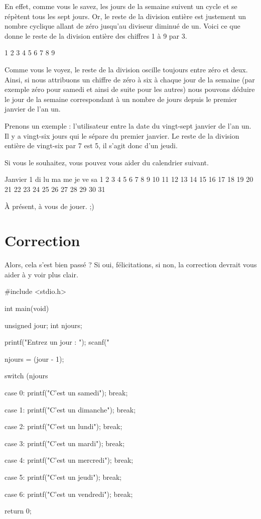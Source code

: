 En effet, comme vous le savez, les jours de la semaine suivent un cycle
et se répètent tous les sept jours. Or, le reste de la division entière
est justement un nombre cyclique allant de zéro jusqu'au diviseur
diminué de un. Voici ce que donne le reste de la division entière des
chiffres 1 à 9 par 3.

\begin{C}
1 %
2 %
3 %
4 %
5 %
6 %
7 %
8 %
9 %
\end{C}

Comme vous le voyez, le reste de la division oscille toujours entre zéro
et deux. Ainsi, si nous attribuons un chiffre de zéro à six à chaque
jour de la semaine (par exemple zéro pour samedi et ainsi de suite pour
les autres) nous pouvons déduire le jour de la semaine correspondant à
un nombre de jours depuis le premier janvier de l'an un.

Prenons un exemple : l'utilisateur entre la date du vingt-sept janvier
de l'an un. Il y a vingt-six jours qui le sépare du premier janvier. Le
reste de la division entière de vingt-six par 7 est 5, il s'agit donc
d'un jeudi.

Si vous le souhaitez, vous pouvez vous aider du calendrier suivant.

\begin{C}
     Janvier 1        
di lu ma me je ve sa  
                   1  
 2  3  4  5  6  7  8  
 9 10 11 12 13 14 15  
16 17 18 19 20 21 22  
23 24 25 26 27 28 29  
30 31
\end{C}

À présent, à vous de jouer. ;)

\section{Correction}
\label{correction-1}

Alors, cela s'est bien passé ? Si oui, félicitations, si non, la
correction devrait vous aider à y voir plus clair.

\begin{C}
 #include <stdio.h>


int
main(void)
{
    unsigned jour;
    int njours;

    printf("Entrez un jour : ");
    scanf("%

    njours = (jour - 1);

    switch (njours %
    {
    case 0:
        printf("C'est un samedi\n");
        break;

    case 1:
        printf("C'est un dimanche\n");
        break;

    case 2:
        printf("C'est un lundi\n");
        break;

    case 3:
        printf("C'est un mardi\n");
        break;

    case 4:
        printf("C'est un mercredi\n");
        break;

    case 5:
        printf("C'est un jeudi\n");
        break;

    case 6:
        printf("C'est un vendredi\n");
        break;
    }
    
    return 0;
}
\end{C}


